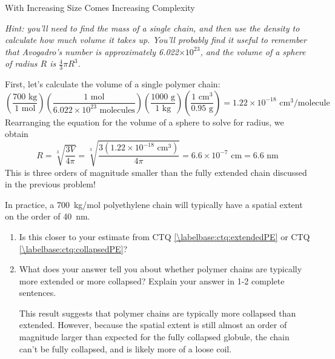 \begin{activity}{With Increasing Size Comes Increasing Complexity}
\begin{ctqs}
		\emph{Hint: you'll need to find the mass of a single chain, and then use the density to calculate how much volume it takes up.  You'll probably find it useful to remember that Avogadro's number is approximately 6.022$\times 10^{23}$, and the volume of a sphere of radius $R$ is $\frac{4}{3}\pi R^3$.}
		
		\begin{solution}[3.85in]
			First, let's calculate the volume of a single polymer chain:
			\begin{equation*}
				\left(\frac{700\text{ kg}}{1\text{ mol}}\right)
				\left(\frac{1\text{ mol}}{6.022\times10^{23}\text{ molecules}}\right)
				\left(\frac{1000\text{ g}}{1\text{ kg}}\right)
				\left(\frac{1\text{ cm}^3}{0.95\text{ g}}\right)
				= 1.22 \times 10^{-18}\text{ cm}^3/\text{molecule}
			\end{equation*}
			Rearranging the equation for the volume of a sphere to solve for radius, we obtain
			\begin{equation*}
				R=\sqrt[3]{\frac{3 V}{4\pi}} = \sqrt[3]{\frac{3 \left(1.22 \times 10^{-18}\text{ cm}^3\right)}{4\pi}} = 6.6 \times 10^{-7}\text{ cm} = 6.6\text{ nm}
			\end{equation*}
			This is three orders of magnitude smaller than the fully extended chain discussed in the previous problem!
		\end{solution}
		
	\question In practice, a 700~kg/mol polyethylene chain will typically have a spatial extent on the order of 40~nm.  
	
		\begin{enumerate}
			\item Is this closer to your estimate from CTQ \ref{\labelbase:ctq:extendedPE} or CTQ \ref{\labelbase:ctq:collapsedPE}?
			
				\begin{solution}[0.5in]\end{solution}
			
			\item What does your answer tell you about whether polymer chains are typically more extended or more collapsed?  Explain your answer in 1-2 complete sentences.
			
				\begin{solution}[1.75in]
					This result suggests that polymer chains are typically more collapsed than extended.  However, because the spatial extent is still almost an order of magnitude larger than expected for the fully collapsed globule, the chain can't be fully collapsed, and is likely more of a loose coil.
				\end{solution}
			

\end{enumerate}
\end{ctqs}
\end{activity}

